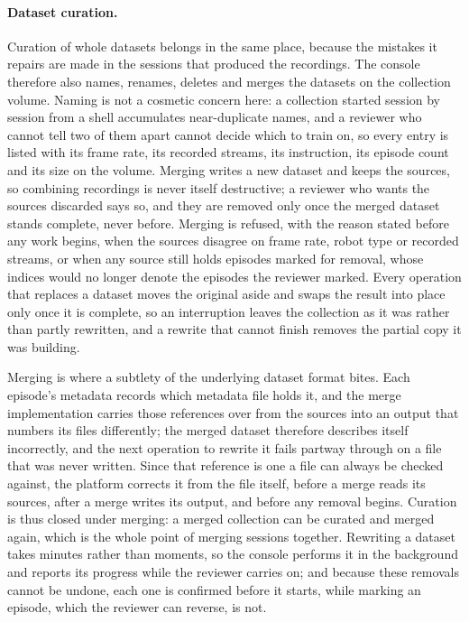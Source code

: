 \paragraph{Dataset curation.} Curation of whole datasets belongs in the same
place, because the mistakes it repairs are made in the sessions that produced
the recordings. The console therefore also names, renames, deletes and merges
the datasets on the collection volume. Naming is not a cosmetic concern here: a
collection started session by session from a shell accumulates near-duplicate
names, and a reviewer who cannot tell two of them apart cannot decide which to
train on, so every entry is listed with its frame rate, its recorded streams,
its instruction, its episode count and its size on the volume. Merging writes a
new dataset and keeps the sources, so combining recordings is never itself
destructive; a reviewer who wants the sources discarded says so, and they are
removed only once the merged dataset stands complete, never before. Merging is
refused, with the reason stated before any work begins, when the sources
disagree on frame rate, robot type or recorded streams, or when any source
still holds episodes marked for removal, whose indices would no longer denote
the episodes the reviewer marked. Every operation that replaces a dataset moves
the original aside and swaps the result into place only once it is complete, so
an interruption leaves the collection as it was rather than partly rewritten,
and a rewrite that cannot finish removes the partial copy it was building.

Merging is where a subtlety of the underlying dataset format bites. Each
episode's metadata records which metadata file holds it, and the merge
implementation carries those references over from the sources into an output
that numbers its files differently; the merged dataset therefore describes
itself incorrectly, and the next operation to rewrite it fails partway through
on a file that was never written. Since that reference is one a file can always
be checked against, the platform corrects it from the file itself, before a
merge reads its sources, after a merge writes its output, and before any
removal begins. Curation is thus closed under merging: a merged collection can
be curated and merged again, which is the whole point of merging sessions
together.
Rewriting a dataset takes minutes rather than moments, so the console performs
it in the background and reports its progress while the reviewer carries on;
and because these removals cannot be undone, each one is confirmed before it
starts, while marking an episode, which the reviewer can reverse, is not.

